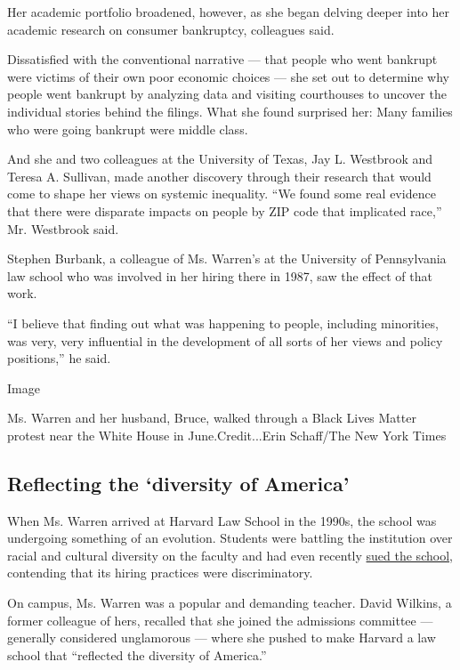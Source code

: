 Her academic portfolio broadened, however, as she began delving deeper
into her academic research on consumer bankruptcy, colleagues said.

Dissatisfied with the conventional narrative --- that people who went
bankrupt were victims of their own poor economic choices --- she set out
to determine why people went bankrupt by analyzing data and visiting
courthouses to uncover the individual stories behind the filings. What
she found surprised her: Many families who were going bankrupt were
middle class.

And she and two colleagues at the University of Texas, Jay L. Westbrook
and Teresa A. Sullivan, made another discovery through their research
that would come to shape her views on systemic inequality. ``We found
some real evidence that there were disparate impacts on people by ZIP
code that implicated race,'' Mr. Westbrook said.

Stephen Burbank, a colleague of Ms. Warren's at the University of
Pennsylvania law school who was involved in her hiring there in 1987,
saw the effect of that work.

``I believe that finding out what was happening to people, including
minorities, was very, very influential in the development of all sorts
of her views and policy positions,'' he said.

Image

Ms. Warren and her husband, Bruce, walked through a Black Lives Matter
protest near the White House in June.Credit...Erin Schaff/The New York
Times

\hypertarget{reflecting-the-diversity-of-america}{%
\subsection{Reflecting the `diversity of
America'}\label{reflecting-the-diversity-of-america}}

When Ms. Warren arrived at Harvard Law School in the 1990s, the school
was undergoing something of an evolution. Students were battling the
institution over racial and cultural diversity on the faculty and had
even recently
\href{https://www.nytimes.com/1992/03/06/archives/battling-harvard-law-over-diversity.html}{sued
the school}, contending that its hiring practices were discriminatory.

On campus, Ms. Warren was a popular and demanding teacher. David
Wilkins, a former colleague of hers, recalled that she joined the
admissions committee --- generally considered unglamorous --- where she
pushed to make Harvard a law school that ``reflected the diversity of
America.''

